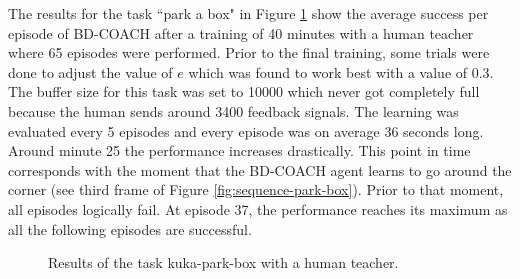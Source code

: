 The results for the task ``park a box" in Figure \ref{fig:kukapark} show the average success per episode of BD-COACH after a training of 40 minutes with a human teacher where 65 episodes were performed. Prior to the final training, some trials were done to adjust the value of $e$ which was found to work best with a value of 0.3. The buffer size for this task was set to 10000 which never got completely full because the human sends around 3400 feedback signals.
The learning was evaluated every 5 episodes and every episode was on average 36 seconds long. Around minute 25 the performance increases drastically. This point in time corresponds with the moment that the BD-COACH agent learns to go around the corner (see third frame of Figure \ref{fig:sequence-park-box}). Prior to that moment, all episodes logically fail. At episode 37, the performance reaches its maximum as all the following episodes are successful.



 \begin{figure}[H]
  \centering

   \caption{Results of the task kuka-park-box with a human teacher.}
  \label{fig:kukapark}
\end{figure}




